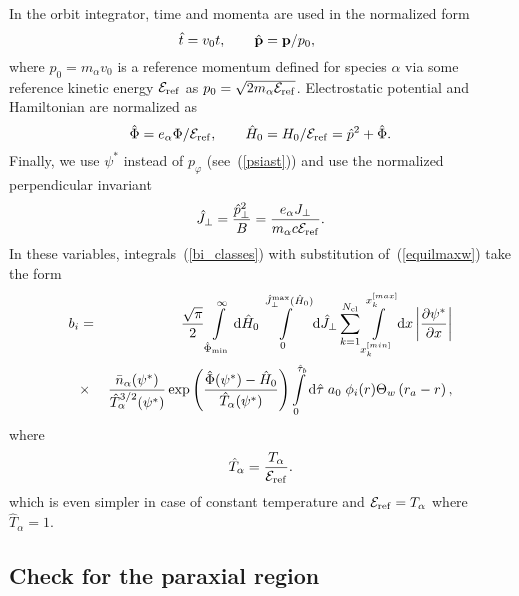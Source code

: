 \documentclass[preprint,prb,aps]{revtex4-1}
\newcommand{\be}[1]{\begin{equation} \label{#1}}
\newcommand{\ee}{\end{equation}}
\newcommand{\bea}[1]{\begin{eqnarray} \label{#1}}
\newcommand{\eea}{\end{eqnarray}}
\newcommand{\eq}[1]{(\ref{#1})}
\newcommand{\difp}[2]{\frac{\partial #1}{\partial #2}}
\newcommand{\bp}{{\bf p}}
\newcommand{\rd}{{\rm d}}
\begin{document}
\noindent
In the orbit integrator, time and momenta are used in the normalized form
\be{normvar}
\hat t = v_0 t,
\qquad
\hat \bp = \bp / p_0,
\qquad
\ee
where $p_0 = m_\alpha v_0$ is a reference momentum defined for species $\alpha$
via some reference kinetic energy ${\cal E}_{\rm ref}$ as $p_0 = \sqrt{2 m_\alpha {\cal E}_{\rm ref}}$. Electrostatic potential and Hamiltonian are normalized as
\be{normPhiandH}
\hat\Phi=e_\alpha\Phi/{\cal E}_{\rm ref},
\qquad
\hat H_0 = H_0/{\cal E}_{\rm ref} = \hat p^2 + \hat\Phi.
\ee
Finally, we use $\psi^\ast$ instead of $p_\varphi$ (see~\eq{psiast}) and use the
normalized perpendicular invariant
\be{normjperp}
\hat J_\perp = \frac{\hat p_\perp^2}{B}=\frac{e_\alpha J_\perp}{m_\alpha c{\cal E}_{\rm ref}}.
\ee
In these variables, integrals~\eq{bi_classes} with substitution of~\eq{equilmaxw}
take the form
\bea{bi_classes_norm}
b_i &=& \frac{\sqrt{\pi}}{2}
\int\limits_{\hat\Phi_{\rm min}}^\infty \rd \hat H_0
\int\limits_0^{\hat J_\perp^{\rm max}(\hat H_0)} \rd \hat J_\perp
\sum\limits_{k=1}^{N_{\rm cl}}
\int\limits_{x^{[min]}_k}^{x^{[max]}_k} \rd x
\left|\difp{\psi^\ast}{x}\right| 
\nonumber \\
&\times&
\frac{\bar n_\alpha(\psi^\ast)}{\hat T_\alpha^{3/2}(\psi^\ast)}
\exp\left(\frac{\hat \Phi(\psi^\ast)-\hat H_0}{\hat T_\alpha(\psi^\ast)} \right)
\int\limits_0^{\hat \tau_b} \rd \hat \tau\;
a_0\; \phi_i(r)
\Theta_w\left(r_a-r\right),
\eea
where
\be{That}
\hat T_\alpha = \frac{T_\alpha}{{\cal E}_{\rm ref}}.
\ee
which is even simpler in case of constant temperature and 
${\cal E}_{\rm ref}=T_\alpha$ where $\hat T_\alpha=1$.

\subsection{Check for the paraxial region}
\end{document}
